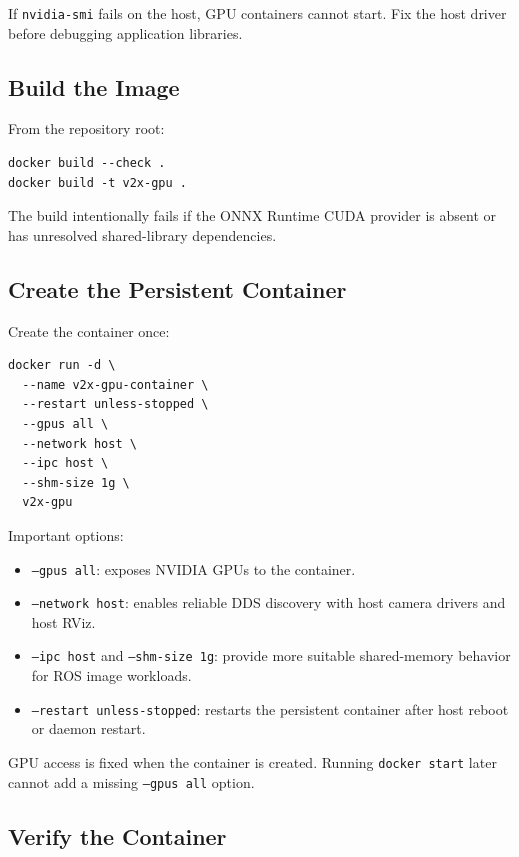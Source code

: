 \documentclass[11pt,a4paper]{article}
\begin{document}
If \texttt{nvidia-smi} fails on the host, GPU containers cannot start. Fix the host driver before debugging application libraries.

\subsection{Build the Image}

From the repository root:

\begin{lstlisting}
docker build --check .
docker build -t v2x-gpu .
\end{lstlisting}

The build intentionally fails if the ONNX Runtime CUDA provider is absent or has unresolved shared-library dependencies.

\subsection{Create the Persistent Container}

Create the container once:

\begin{lstlisting}
docker run -d \
  --name v2x-gpu-container \
  --restart unless-stopped \
  --gpus all \
  --network host \
  --ipc host \
  --shm-size 1g \
  v2x-gpu
\end{lstlisting}

Important options:

\begin{itemize}
  \item \texttt{--gpus all}: exposes NVIDIA GPUs to the container.
  \item \texttt{--network host}: enables reliable DDS discovery with host camera drivers and host RViz.
  \item \texttt{--ipc host} and \texttt{--shm-size 1g}: provide more suitable shared-memory behavior for ROS image workloads.
  \item \texttt{--restart unless-stopped}: restarts the persistent container after host reboot or daemon restart.
\end{itemize}

GPU access is fixed when the container is created. Running \texttt{docker start} later cannot add a missing \texttt{--gpus all} option.

\subsection{Verify the Container}
\end{document}
